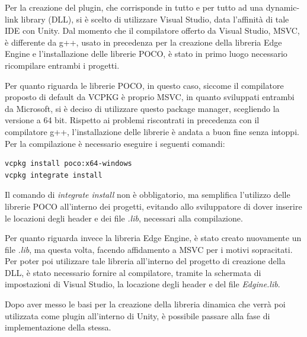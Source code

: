 Per la creazione del plugin, che corrisponde in tutto e per tutto ad una dynamic-link library (DLL), si è scelto di utilizzare Visual Studio, data l'affinità di tale IDE con Unity. Dal momento che il compilatore offerto da Visual Studio, MSVC, è differente da g++, usato in precedenza per la creazione della libreria Edge Engine e l’installazione delle librerie POCO, è stato in primo luogo necessario ricompilare entrambi i progetti.

Per quanto riguarda le librerie POCO, in questo caso, siccome il compilatore proposto di default da VCPKG è proprio MSVC, in quanto sviluppati entrambi da Microsoft, si è deciso di utilizzare questo package manager, scegliendo la versione a 64 bit. Rispetto ai problemi riscontrati in precedenza con il compilatore g++, l’installazione delle librerie è andata a buon fine senza intoppi. Per la compilazione è necessario eseguire i seguenti comandi:

\begin{verbatim}
vcpkg install poco:x64-windows
vcpkg integrate install
\end{verbatim}

Il comando di \textit{integrate install} non è obbligatorio, ma semplifica l'utilizzo delle librerie POCO all'interno dei progetti, evitando allo sviluppatore di dover inserire le locazioni degli header e dei file \textit{.lib}, necessari alla compilazione.

Per quanto riguarda invece la libreria Edge Engine, è stato creato nuovamente un file \textit{.lib}, ma questa volta, facendo affidamento a MSVC per i motivi sopracitati. Per poter poi utilizzare tale libreria all'interno del progetto di creazione della DLL, è stato necessario fornire al compilatore, tramite la schermata di impostazioni di Visual Studio, la locazione degli header e del file \textit{Edgine.lib}.

Dopo aver messo le basi per la creazione della libreria dinamica che verrà poi utilizzata come plugin all'interno di Unity, è possibile passare alla fase di implementazione della stessa.

